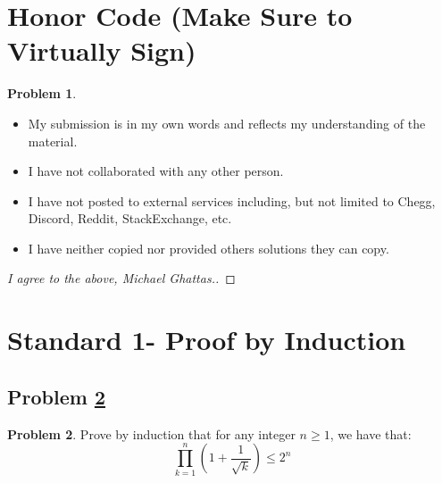 \documentclass[11pt]{article}
\theoremstyle{definition}
\theoremstyle{definition}
\newtheorem{required}{Problem}
\theoremstyle{definition}
\begin{document}
\section{Honor Code (Make Sure to Virtually Sign)} \label{HonorCode}

\begin{required}
\noindent 
\begin{itemize}
\item My submission is in my own words and reflects my understanding of the material.
\item I have not collaborated with any other person.
\item I have not posted to external services including, but not limited to Chegg, Discord, Reddit, StackExchange, etc.
\item I have neither copied nor provided others solutions they can copy.
\end{itemize}

\end{required}

\begin{proof}[I agree to the above, Michael Ghattas.]
\end{proof}



\newpage
\section{Standard 1- Proof by Induction}

\subsection{Problem \ref{Induction1}}
\begin{required} \label{Induction1}
Prove by induction that for any integer $n \geq 1$, we have that:
\[
\prod_{k=1}^{n} \left( 1 + \frac{1}{\sqrt{k}} \right) \leq 2^{n}
\]
\end{required}


\end{document}
